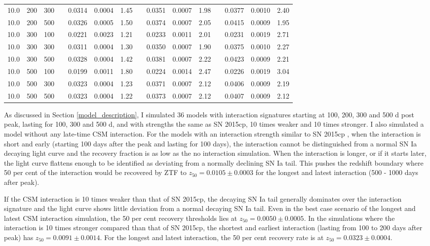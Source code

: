 \documentclass[a4paper,oneside,12pt, class=Latex/Classes/PhDthesisPSnPDF, crop=false]{standalone}
\begin{document}
\begin{table}
{\begin{tabular}{cccclcrclcrclcr}
  10.0 & 200 & 300 && 0.0314 & 0.0004 & 1.45 && 0.0351 & 0.0007 & 1.98 && 0.0377 & 0.0010 & 2.40\\
  10.0 & 200 & 500 && 0.0326 & 0.0005 & 1.50 && 0.0374 & 0.0007 & 2.05 && 0.0415 & 0.0009 & 1.95\\
  10.0 & 300 & 100 && 0.0221 & 0.0023 & 1.21 && 0.0233 & 0.0011 & 2.01 && 0.0231 & 0.0019 & 2.71\\
  10.0 & 300 & 300 && 0.0311 & 0.0004 & 1.30 && 0.0350 & 0.0007 & 1.90 && 0.0375 & 0.0010 & 2.27\\
  10.0 & 300 & 500 && 0.0328 & 0.0004 & 1.42 && 0.0381 & 0.0007 & 2.22 && 0.0423 & 0.0009 & 2.21\\
  10.0 & 500 & 100 && 0.0199 & 0.0011 & 1.80 && 0.0224 & 0.0014 & 2.47 && 0.0226 & 0.0019 & 3.04\\
  10.0 & 500 & 300 && 0.0323 & 0.0004 & 1.23 && 0.0371 & 0.0007 & 2.12 && 0.0406 & 0.0009 & 2.19\\
  10.0 & 500 & 500 && 0.0323 & 0.0004 & 1.22 && 0.0373 & 0.0007 & 2.12 && 0.0407 & 0.0009 & 2.12\\
  \hline
 \end{tabular}
 }
 \label{sim_z50_results}
\end{table}

 As discussed in Section \ref{model_description}, I simulated 36 models with interaction signatures starting at 100, 200, 300 and 500 d post peak, lasting for 100, 300 and 500 d, and with strengths the same as SN 2015cp, 10 times weaker and 10 times stronger. I also simulated a model without any late-time CSM interaction. For the models with an interaction strength similar to SN 2015cp \citep{2015cp}, when the interaction is short and early (starting 100 days after the peak and lasting for 100 days), the interaction cannot be distinguished from a normal SN Ia decaying light curve and the recovery fraction is as low as the no interaction simulation. When the interaction is longer, or if it starts later, the light curve flattens enough to be identified as deviating from a normally declining SN Ia tail. This pushes the redshift boundary where 50 per cent of the interaction would be recovered by ZTF to $z_{50} = 0.0105 \pm 0.0003$ for the longest and latest interaction (500 - 1000 days after peak).

If the CSM interaction is 10 times weaker than that of SN 2015cp, the decaying SN Ia tail generally dominates over the interaction signature and the light curve shows little deviation from a normal decaying SN Ia tail. Even in the best case scenario of the longest and latest CSM interaction simulation, the 50 per cent recovery thresholds lies at $z_{50} = 0.0050 \pm 0.0005$. In the simulations where the interaction is 10 times stronger compared than that of SN 2015cp, the shortest and earliest interaction (lasting from 100 to 200 days after peak) has $z_{50} = 0.0091 \pm 0.0014$. For the longest and latest interaction, the 50 per cent recovery rate is at $z_{50} = 0.0323 \pm 0.0004$.
\end{document}
